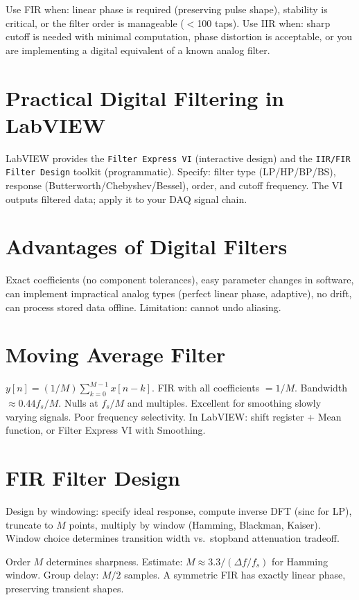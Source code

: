 \documentclass[11pt,letterpaper,twoside,openany]{book}
\begin{document}
\begin{tipbox}
Use FIR when: linear phase is required (preserving pulse shape), stability is critical, or the filter order is manageable ($<$100 taps). Use IIR when: sharp cutoff is needed with minimal computation, phase distortion is acceptable, or you are implementing a digital equivalent of a known analog filter.
\end{tipbox}

\section{Practical Digital Filtering in LabVIEW}
LabVIEW provides the \texttt{Filter Express VI} (interactive design) and the \texttt{IIR/FIR Filter Design} toolkit (programmatic). Specify: filter type (LP/HP/BP/BS), response (Butterworth/Chebyshev/Bessel), order, and cutoff frequency. The VI outputs filtered data; apply it to your DAQ signal chain.


\section{Advantages of Digital Filters}
Exact coefficients (no component tolerances), easy parameter changes in software, can implement impractical analog types (perfect linear phase, adaptive), no drift, can process stored data offline. Limitation: cannot undo aliasing.

\section{Moving Average Filter}
$y[n] = (1/M)\sum_{k=0}^{M-1}x[n-k]$. FIR with all coefficients $= 1/M$. Bandwidth $\approx 0.44 f_s/M$. Nulls at $f_s/M$ and multiples. Excellent for smoothing slowly varying signals. Poor frequency selectivity. In LabVIEW: shift register + Mean function, or Filter Express VI with Smoothing.

\section{FIR Filter Design}
Design by windowing: specify ideal response, compute inverse DFT (sinc for LP), truncate to $M$ points, multiply by window (Hamming, Blackman, Kaiser). Window choice determines transition width vs.\ stopband attenuation tradeoff.

Order $M$ determines sharpness. Estimate: $M \approx 3.3/(\Delta f/f_s)$ for Hamming window. Group delay: $M/2$ samples. A symmetric FIR has exactly linear phase, preserving transient shapes.
\end{document}
